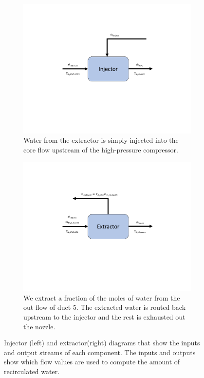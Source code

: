 \documentclass[conf]{new-aiaa}
\begin{document}
\begin{figure}[hbt!]
    \centering
    \begin{subfigure}[t]{0.49\textwidth}
        \includegraphics[width=\textwidth]{injector.pdf}
        \caption{
            Water from the extractor is simply injected into the core flow upstream of the high-pressure compressor.
        }
        \label{fig:injector}
    \end{subfigure}
    \hspace{2pt}
    \begin{subfigure}[t]{0.49\textwidth}
        \includegraphics[width=\textwidth]{extractor.pdf}
        \caption{
            We extract a fraction of the moles of water from the out flow of duct 5.
            The extracted water is routed back upstream to the injector and the rest is exhausted out the nozzle.
        }
        \label{fig:extractor}
    \end{subfigure}
    \caption{Injector (left) and extractor(right) diagrams that show the inputs and output streams of each component.
        The inputs and outputs show which flow values are used to compute the amount of recirculated water.}
    \label{fig:extract_inject}
\end{figure}
\end{document}
